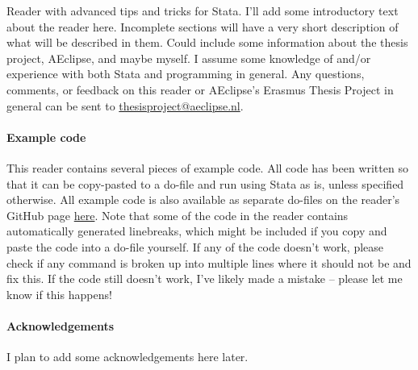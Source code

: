 Reader with advanced tips and tricks for Stata.
I'll add some introductory text about the reader here.
Incomplete sections will have a very short description of what will be described in them.
Could include some information about the thesis project, AEclipse, and maybe myself.
I assume some knowledge of and/or experience with both Stata and programming in general.
Any questions, comments, or feedback on this reader or AEclipse's Erasmus Thesis Project in general can be sent to \href{mailto:thesisproject@aeclipse.nl}{thesisproject@aeclipse.nl}.

\paragraph{Example code}
This reader contains several pieces of example code.
All code has been written so that it can be copy-pasted to a do-file and run using Stata as is,
unless specified otherwise.
All example code is also available as separate do-files on the reader's GitHub page \href{https://github.com/Ahvns/ETPreader/tree/main/Example%20do-files}{here}.
Note that some of the code in the reader contains automatically generated linebreaks,
which might be included if you copy and paste the code into a do-file yourself.
If any of the code doesn't work,
please check if any command is broken up into multiple lines where it should not be and fix this.
If the code still doesn't work, I've likely made a mistake --
please let me know if this happens!

\paragraph{Acknowledgements}
I plan to add some acknowledgements here later.
